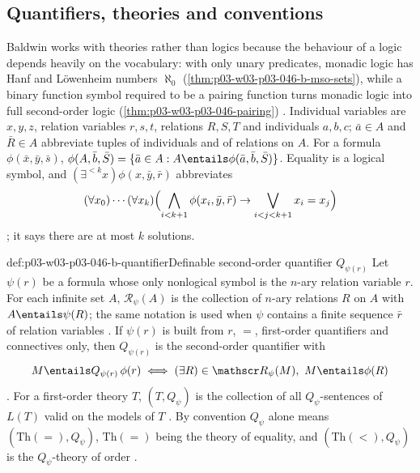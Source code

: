 \subsection{Quantifiers, theories and conventions}
\label{sec:p03-w03-p03-046-b-conventions}

Baldwin works with theories rather than logics because the behaviour of a
logic depends heavily on the vocabulary: with only unary predicates,
monadic logic has Hanf and L\"owenheim numbers \(\aleph_0\)
(\cref{thm:p03-w03-p03-046-b-mso-sets}), while a binary function symbol
required to be a pairing function turns monadic logic into full
second-order logic (\cref{thm:p03-w03-p03-046-pairing})
\cite[p.~446]{Baldwin1985DSOQ}. Individual variables are \(x,y,z\),
relation variables \(r,s,t\), relations \(R,S,T\) and individuals
\(a,b,c\); \(\bar a\in A\) and \(\bar R\in A\) abbreviate tuples of
individuals and of relations on \(A\). For a formula \(\phi(\bar x,\bar
y,\bar s)\), \(\phi(A,\bar b,\bar S)=\{\bar a\in A:A\entails\phi(\bar
a,\bar b,\bar S)\}\). Equality is a logical symbol, and
\((\exists^{<k}x)\phi(x,\bar y,\bar r)\) abbreviates
\[
(\forall x_0)\cdots(\forall x_k)\Bigl(\bigwedge_{i<k+1}\phi(x_i,\bar y,\bar r)
\to\bigvee_{i<j<k+1}x_i=x_j\Bigr)
\]
\cite[p.~446]{Baldwin1985DSOQ}; it says there are at most \(k\) solutions.

\begin{hbdefinition}{def:p03-w03-p03-046-b-quantifier}{Definable second-order quantifier \(Q_{\psi(r)}\)}
Let \(\psi(r)\) be a formula whose only nonlogical symbol is the \(n\)-ary
relation variable \(r\). For each infinite set \(A\),
\(\mathscr R_\psi(A)\) is the collection of \(n\)-ary relations \(R\) on
\(A\) with \(A\entails\psi(R)\); the same notation is used when \(\psi\)
contains a finite sequence \(\bar r\) of relation variables
\cite[p.~447, Notation~1.2.1]{Baldwin1985DSOQ}. If \(\psi(r)\) is built
from \(r\), \(=\), first-order quantifiers and connectives only, then
\(Q_{\psi(r)}\) is the second-order quantifier with
\[
M\entails Q_{\psi(r)}\,\phi(r)\iff(\exists R)\in\mathscr R_\psi(M),\
M\entails\phi(R)
\]
\cite[p.~447, Definition~1.2.2]{Baldwin1985DSOQ}. For a first-order theory
\(T\), \((T,Q_\psi)\) is the collection of all \(Q_\psi\)-sentences of
\(L(T)\) valid on the models of \(T\)
\cite[p.~447, Definition~1.2.3]{Baldwin1985DSOQ}. By convention \(Q_\psi\)
alone means \((\mathrm{Th}(=),Q_\psi)\), \(\mathrm{Th}(=)\) being the theory of
equality, and \((\mathrm{Th}(<),Q_\psi)\) is the \(Q_\psi\)-theory of order
\cite[p.~447]{Baldwin1985DSOQ}.
\end{hbdefinition}

